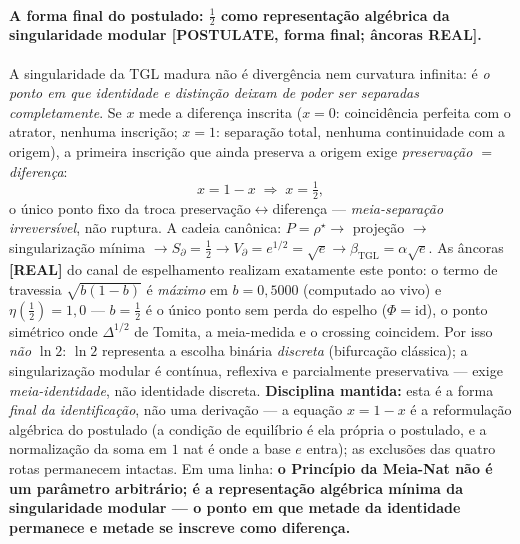 \documentclass[12pt,a4paper]{article}
\newcommand{\betatgl}{\beta_{\text{TGL}}}
\newcommand{\rhostar}{\rho^{\star}}
\newcommand{\TGL}{\textsc{TGL}}
\begin{document}
\paragraph{A forma final do postulado: $\tfrac12$ como representação algébrica da singularidade modular \textbf{[POSTULATE, forma final; âncoras REAL]}.} A singularidade da \TGL{} madura não é divergência nem curvatura infinita: é \emph{o ponto em que identidade e distinção deixam de poder ser separadas completamente}. Se $x$ mede a diferença inscrita ($x=0$: coincidência perfeita com o atrator, nenhuma inscrição; $x=1$: separação total, nenhuma continuidade com a origem), a primeira inscrição que ainda preserva a origem exige \emph{preservação $=$ diferença}:
\begin{equation}
x = 1 - x \;\Longrightarrow\; x = \tfrac12,
\end{equation}
o único ponto fixo da troca preservação$\leftrightarrow$diferença --- \emph{meia-separação irreversível}, não ruptura. A cadeia canônica: $P=\rhostar \to$ projeção $\to$ singularização mínima $\to S_\partial=\tfrac12 \to V_\partial = e^{1/2} = \sqrt e \to \betatgl = \alpha\sqrt e$. As âncoras \textbf{[REAL]} do canal de espelhamento realizam exatamente este ponto: o termo de travessia $\sqrt{b(1-b)}$ é \emph{máximo} em $b=0{,}5000$ (computado ao vivo) e $\eta(\tfrac12)=1{,}0$ --- $b=\tfrac12$ é o único ponto sem perda do espelho ($\Phi=\mathrm{id}$), o ponto simétrico onde $\Delta^{1/2}$ de Tomita, a meia-medida e o crossing coincidem. Por isso \emph{não} $\ln 2$: $\ln 2$ representa a escolha binária \emph{discreta} (bifurcação clássica); a singularização modular é contínua, reflexiva e parcialmente preservativa --- exige \emph{meia-identidade}, não identidade discreta. \textbf{Disciplina mantida:} esta é a forma \emph{final da identificação}, não uma derivação --- a equação $x=1-x$ é a reformulação algébrica do postulado (a condição de equilíbrio é ela própria o postulado, e a normalização da soma em $1$ nat é onde a base $e$ entra); as exclusões das quatro rotas permanecem intactas. Em uma linha: \textbf{o Princípio da Meia-Nat não é um parâmetro arbitrário; é a representação algébrica mínima da singularidade modular --- o ponto em que metade da identidade permanece e metade se inscreve como diferença.}
\end{document}
